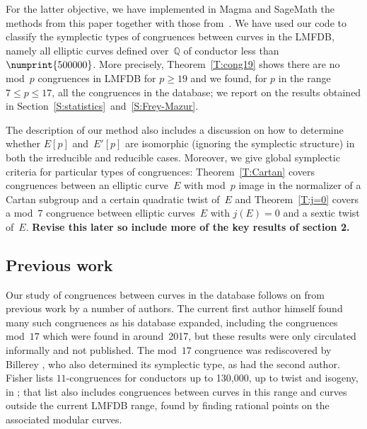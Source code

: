 \documentclass[12pt, reqno]{amsart}
\newcommand{\Q}{\mathbb{Q}}
\newcommand{\rhobar}{{\overline{\rho}}}
\numberwithin{equation}{section}
\theoremstyle{definition}
\theoremstyle{remark}
\newcommand{\Sage}{{\sc SageMath}}
\newcommand{\Magma}{{\sc Magma}}
\begin{document}

For the latter objective, we have implemented in {\Magma} \cite{magma}
and {\Sage} \cite{sage} the methods from this paper together with
those from~\cite{FKSym}. We have used our code to classify the
symplectic types of congruences between curves in the LMFDB, namely
all elliptic curves defined over~$\Q$ of conductor less
than~$\numprint{500000}$. More precisely, Theorem~\ref{T:cong19} shows
there are no mod~$p$ congruences in LMFDB for $p \geq 19$ and we
found, for $p$ in the range $7 \leq p \leq 17$, all the congruences in
the database; we report on the results obtained in
Section~\ref{S:statistics}~and~\ref{S:Frey-Mazur}.

The description of our method also includes a discussion on how to
determine whether $E[p]$ and~$E'[p]$ are isomorphic (ignoring the
symplectic structure) in both the irreducible and reducible
cases. Moreover, we give global symplectic criteria for particular
types of congruences: Theorem~\ref{T:Cartan} covers congruences
between an elliptic curve~$E$ with mod~$p$ image in the normalizer of
a Cartan subgroup and a certain quadratic twist of~$E$ and
Theorem~\ref{T:j=0} covers a mod~$7$ congruence between elliptic
curves~$E$ with $j(E)=0$ and a sextic twist of~$E$.
\textbf{Revise this later so include more of the key results of
  section 2.}

\subsection{Previous work}
Our study of congruences between curves in the database follows on
from previous work by a number of authors.  The current first author
himself found many such congruences as his database expanded,
including the congruences mod~$17$ which were found in around~2017,
but these results were only circulated informally and not published.
The mod~$17$ congruence was rediscovered by Billerey
\cite{Billerey17}, who also determined its symplectic type, as had the
second author.  Fisher lists $11$-congruences for conductors up to
130,000, up to twist and isogeny, in \cite{FisherList}; that list also
includes congruences between curves in this range and curves outside
the current LMFDB range, found by finding rational points on the associated modular
curves.
\end{document}
